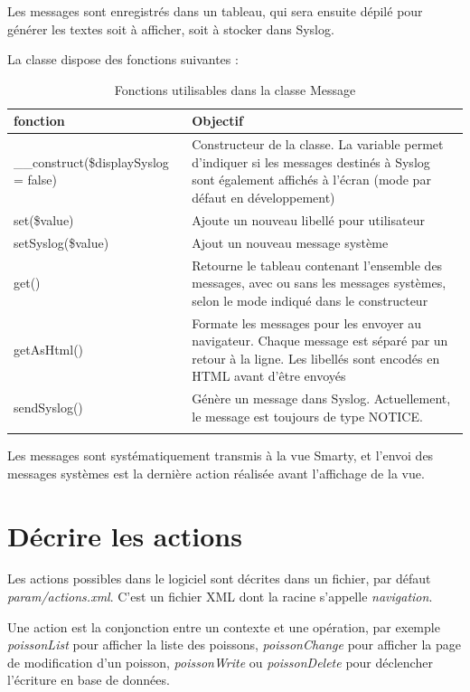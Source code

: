 Les messages sont enregistrés dans un tableau, qui sera ensuite dépilé pour générer les textes soit à afficher, soit à stocker dans Syslog.

La classe dispose des fonctions suivantes :
\begin{longtable}{|p{5cm}|p{8cm}|}
\hline
\textbf{fonction} & \textbf{Objectif} \\
\hline
\endhead
\hline\endfoot\endlastfoot
\_\_construct(\$displaySyslog = false) & Constructeur de la classe. La variable permet d'indiquer si les messages destinés à Syslog sont également affichés à l'écran (mode par défaut en développement) \\

set(\$value) & Ajoute un nouveau libellé pour utilisateur \\

setSyslog(\$value) & Ajout un nouveau message système \\

get() & Retourne le tableau contenant l'ensemble des messages, avec ou sans les messages systèmes, selon le mode indiqué dans le constructeur \\

getAsHtml() & Formate les messages pour les envoyer au navigateur. Chaque message est séparé par un retour à la ligne. Les libellés sont encodés en HTML avant d'être envoyés \\

sendSyslog() & Génère un message dans Syslog. Actuellement, le message est toujours de type NOTICE. \\
\hline

\caption{Fonctions utilisables dans la classe Message}
\end{longtable}

Les messages sont systématiquement transmis à la vue Smarty, et l'envoi des messages systèmes est la dernière action réalisée avant l'affichage de la vue.

\chapter{Décrire les actions}\label{labelxml}

Les actions possibles dans le logiciel sont décrites dans un fichier, par défaut \textit{param/actions.xml}. C'est un fichier XML dont la racine s'appelle \textit{navigation}. 

Une action est la conjonction entre un contexte et une opération, par exemple \textit{poissonList} pour afficher la liste des poissons, \textit{poissonChange} pour afficher la page de modification d'un poisson, \textit{poissonWrite} ou \textit{poissonDelete} pour déclencher l'écriture en base de données.

